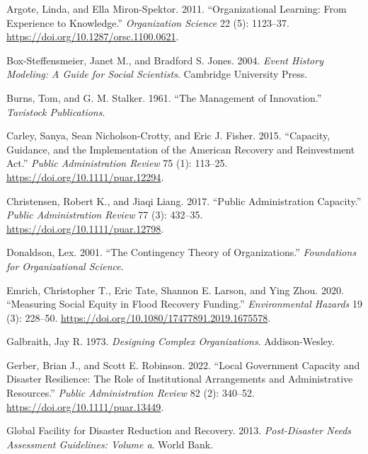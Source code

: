 \documentclass[
  12pt,
  letterpaper,
]{article}
\newlength{\cslhangindent}
\newenvironment{CSLReferences}[2] %
 {\begin{list}{}{%
  \setlength{\itemindent}{0pt}
  \setlength{\leftmargin}{0pt}
  \setlength{\parsep}{0pt}
  \ifodd #1
   \setlength{\leftmargin}{\cslhangindent}
   \setlength{\itemindent}{-1\cslhangindent}
  \fi
  \setlength{\itemsep}{#2\baselineskip}}}
 {\end{list}}
\begin{document}
\label{refs}
\begin{CSLReferences}{1}{1}
Argote, Linda, and Ella Miron-Spektor. 2011. {``Organizational Learning:
From Experience to Knowledge.''} \emph{Organization Science} 22 (5):
1123--37. \url{https://doi.org/10.1287/orsc.1100.0621}.

Box-Steffensmeier, Janet M., and Bradford S. Jones. 2004. \emph{Event
History Modeling: A Guide for Social Scientists}. Cambridge University
Press.

Burns, Tom, and G. M. Stalker. 1961. {``The Management of Innovation.''}
\emph{Tavistock Publications}.

Carley, Sanya, Sean Nicholson-Crotty, and Eric J. Fisher. 2015.
{``Capacity, Guidance, and the Implementation of the {A}merican
{R}ecovery and {R}einvestment {A}ct.''} \emph{Public Administration
Review} 75 (1): 113--25. \url{https://doi.org/10.1111/puar.12294}.

Christensen, Robert K., and Jiaqi Liang. 2017. {``Public Administration
Capacity.''} \emph{Public Administration Review} 77 (3): 432--35.
\url{https://doi.org/10.1111/puar.12798}.

Donaldson, Lex. 2001. {``The Contingency Theory of Organizations.''}
\emph{Foundations for Organizational Science}.

Emrich, Christopher T., Eric Tate, Shannon E. Larson, and Ying Zhou.
2020. {``Measuring Social Equity in Flood Recovery Funding.''}
\emph{Environmental Hazards} 19 (3): 228--50.
\url{https://doi.org/10.1080/17477891.2019.1675578}.

Galbraith, Jay R. 1973. \emph{Designing Complex Organizations}.
Addison-Wesley.

Gerber, Brian J., and Scott E. Robinson. 2022. {``Local Government
Capacity and Disaster Resilience: The Role of Institutional Arrangements
and Administrative Resources.''} \emph{Public Administration Review} 82
(2): 340--52. \url{https://doi.org/10.1111/puar.13449}.

Global Facility for Disaster Reduction and Recovery. 2013.
\emph{Post-Disaster Needs Assessment Guidelines: Volume a}. World Bank.


\end{CSLReferences}
\end{document}
